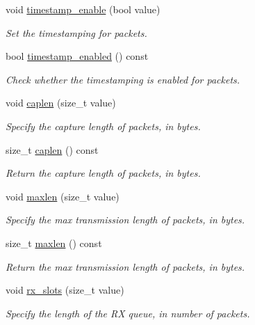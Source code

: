 \begin{DoxyCompactItemize}
void \hyperlink{classpfq_1_1socket_ab21f7cd8d22e57ec28b3038d259561bc}{timestamp\+\_\+enable} (bool value)
\begin{DoxyCompactList}\small\item\em Set the timestamping for packets. \end{DoxyCompactList}\item 
bool \hyperlink{classpfq_1_1socket_a6a170b8ebc6b03760c4096cd176af8cf}{timestamp\+\_\+enabled} () const 
\begin{DoxyCompactList}\small\item\em Check whether the timestamping is enabled for packets. \end{DoxyCompactList}\item 
void \hyperlink{classpfq_1_1socket_ab68dbba5ef01041b9c96758c4a9f0a6c}{caplen} (size\+\_\+t value)
\begin{DoxyCompactList}\small\item\em Specify the capture length of packets, in bytes. \end{DoxyCompactList}\item 
size\+\_\+t \hyperlink{classpfq_1_1socket_a768bee4d974acdc5ee9ee879b0903c54}{caplen} () const 
\begin{DoxyCompactList}\small\item\em Return the capture length of packets, in bytes. \end{DoxyCompactList}\item 
void \hyperlink{classpfq_1_1socket_a863da5015c00d6a49f1515b703c24230}{maxlen} (size\+\_\+t value)
\begin{DoxyCompactList}\small\item\em Specify the max transmission length of packets, in bytes. \end{DoxyCompactList}\item 
size\+\_\+t \hyperlink{classpfq_1_1socket_a45bd7aa973fe4eccce899c552adfedb5}{maxlen} () const 
\begin{DoxyCompactList}\small\item\em Return the max transmission length of packets, in bytes. \end{DoxyCompactList}\item 
void \hyperlink{classpfq_1_1socket_a5cf700fc12d67b91df3d669ac4aa737a}{rx\+\_\+slots} (size\+\_\+t value)
\begin{DoxyCompactList}\small\item\em Specify the length of the R\+X queue, in number of packets. \end{DoxyCompactList}\item 

\end{DoxyCompactItemize}
